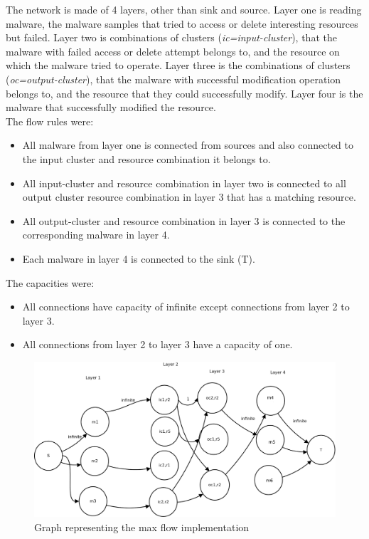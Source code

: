 The network is made of 4 layers, other than sink and source. Layer one is reading malware, the malware samples that tried to access or delete interesting resources but failed.
Layer two is combinations of clusters (\emph{ic=input-cluster}), that the malware with failed access or delete attempt belongs to, and the resource on which the malware tried to operate.
Layer three is the combinations of clusters (\emph{oc=output-cluster}), that the malware with successful modification operation belongs to, and the resource that they could successfully modify.
Layer four is the malware that successfully modified the resource.\\
The flow rules were:
\begin{itemize}
  \item All malware from layer one is connected from sources and also connected to the input cluster and resource combination it belongs to.
  \item All input-cluster and resource combination in layer two is connected to all output cluster resource combination in layer 3 that has a matching resource.
  \item All output-cluster and resource combination in layer 3 is connected to the corresponding malware in layer 4.
  \item Each malware in layer 4 is connected to the sink (T).
\end{itemize}
The capacities were:
\begin{itemize}
  \item All connections have capacity of infinite except connections from layer 2 to layer 3.
  \item All connections from layer 2 to layer 3 have a capacity of one.
\end{itemize}
\begin{figure}[h]
  \centering
  \includegraphics[scale=0.23]{figures/maxflow2.png}
  \caption[Max Flow]{Graph representing the max flow implementation}\label{fig:maxflow}
\end{figure}
